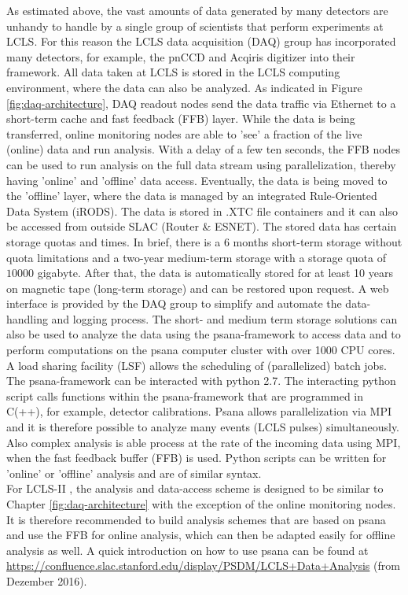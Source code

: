 As estimated above, the vast amounts of data generated by many detectors are unhandy to handle by a single group of scientists that perform experiments at LCLS. For this reason the LCLS data acquisition (DAQ) group has incorporated many detectors, for example, the pnCCD and Acqiris digitizer into their framework. All data taken at LCLS is stored in the LCLS computing environment, where the data can also be analyzed. As indicated in Figure \ref{fig:daq-architecture}, DAQ readout nodes send the data traffic via Ethernet to a short-term cache and fast feedback (FFB) layer. While the data is being transferred, online monitoring nodes are able to 'see' a fraction of the live (online) data and run analysis. With a delay of a few ten seconds, the FFB nodes can be used to run analysis on the full data stream using parallelization, thereby having 'online' and 'offline' data access. Eventually, the data is being moved to the 'offline' layer, where the data is managed by an integrated Rule-Oriented Data System (iRODS). The data is stored in .XTC file containers and it can also be accessed from outside SLAC (Router \& ESNET). The stored data has certain storage quotas and times. In brief, there is a 6 months short-term storage without quota limitations and a two-year medium-term storage with a storage quota of $10 000$ gigabyte. After that, the data is automatically stored for at least 10 years on magnetic tape (long-term storage) and can be restored upon request. A web interface is provided by the DAQ group to simplify and automate the data-handling and logging process. The short- and medium term storage solutions can also be used to analyze the data using the psana-framework to access data and to perform computations on the psana computer cluster with over 1000 CPU cores. A load sharing facility (LSF) allows the scheduling of (parallelized) batch jobs. The psana-framework can be interacted with python 2.7. The interacting python script calls functions within the psana-framework that are programmed in C(++), for example, detector calibrations. Psana allows parallelization via MPI and it is therefore possible to analyze many events (LCLS pulses) simultaneously. Also complex analysis is able process at the rate of the incoming data using MPI, when the fast feedback buffer (FFB) is used. Python scripts can be written for 'online' or 'offline' analysis and are of similar syntax.\\
For LCLS-II \citep{Amadeo-2016-SLAC}, the analysis and data-access scheme is designed to be similar to Chapter \ref{fig:daq-architecture} with the exception of the online monitoring nodes. It is therefore recommended to build analysis schemes that are based on psana and use the FFB for online analysis, which can then be adapted easily for offline analysis as well. A quick introduction on how to use psana can be found at \url{https://confluence.slac.stanford.edu/display/PSDM/LCLS+Data+Analysis} (from Dezember 2016).
%
%
%
